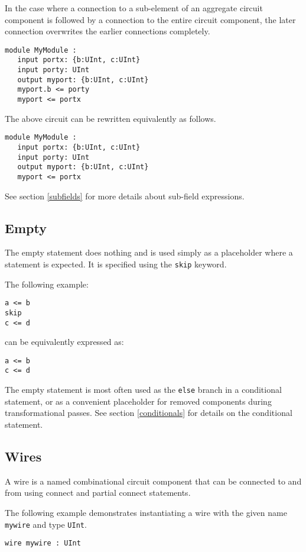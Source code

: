 \documentclass[12pt]{article}
\begin{document}
In the case where a connection to a sub-element of an aggregate circuit component is followed by a connection to the entire circuit component, the later connection overwrites the earlier connections completely.

\begin{lstlisting}
module MyModule :
   input portx: {b:UInt, c:UInt}
   input porty: UInt
   output myport: {b:UInt, c:UInt}
   myport.b <= porty
   myport <= portx
\end{lstlisting}
The above circuit can be rewritten equivalently as follows.
\begin{lstlisting}
module MyModule :
   input portx: {b:UInt, c:UInt}
   input porty: UInt
   output myport: {b:UInt, c:UInt}
   myport <= portx
\end{lstlisting}

See section \ref{subfields} for more details about sub-field expressions.

\subsection{Empty}
The empty statement does nothing and is used simply as a placeholder where a statement is expected. It is specified using the \verb|skip| keyword.

The following example:
\begin{lstlisting}
a <= b
skip
c <= d
\end{lstlisting}
can be equivalently expressed as:
\begin{lstlisting}
a <= b
c <= d
\end{lstlisting}

The empty statement is most often used as the \verb|else| branch in a conditional statement, or as a convenient placeholder for removed components during transformational passes. See section \ref{conditionals} for details on the conditional statement.

\subsection{Wires}
A wire is a named combinational circuit component that can be connected to and from using connect and partial connect statements.

The following example demonstrates instantiating a wire with the given name \verb|mywire| and type \verb|UInt|.

\begin{lstlisting}
wire mywire : UInt
\end{lstlisting}
\end{document}
